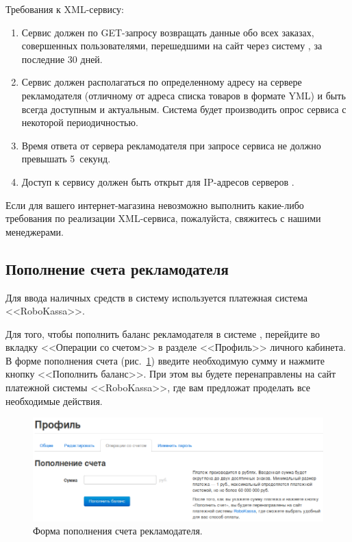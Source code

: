 \documentclass[a4paper,12pt]{article}
\begin{document}
Требования к XML-сервису:
\begin{enumerate}
\item Сервис должен по GET-запросу возвращать данные обо всех заказах, совершенных пользователями, перешедшими на сайт через систему \heymoose{}, за последние 30 дней.
\item Сервис должен располагаться по определенному адресу на сервере рекламодателя (отличному от адреса списка товаров в формате YML) и быть всегда доступным и актуальным. Система \heymoose{} будет производить опрос сервиса с некоторой периодичностью.
\item Время ответа от сервера рекламодателя при запросе сервиса не должно превышать 5~секунд.
\item Доступ к сервису должен быть открыт для IP-адресов серверов \heymoose{}.
\end{enumerate}

Если для вашего интернет-магазина невозможно выполнить какие-либо требования по реализации XML-сервиса, пожалуйста, свяжитесь с нашими менеджерами.

\subsection{Пополнение счета рекламодателя}

Для ввода наличных средств в систему \heymoose{} используется платежная система <<RoboKassa>>.

Для того, чтобы пополнить баланс рекламодателя в системе \heymoose{}, перейдите во вкладку <<Операции со счетом>> в разделе <<Профиль>> личного кабинета. В форме пополнения счета (рис.~\ref{fig:operations}) введите необходимую сумму и нажмите кнопку <<Пополнить баланс>>. При этом вы будете перенаправлены на сайт платежной системы <<RoboKassa>>, где вам предложат проделать все необходимые действия.

\begin{figure}[!ht]
\centering
\includegraphics[width=\textwidth]{include/operations.png}
\caption{Форма пополнения счета рекламодателя.}
\label{fig:operations}
\end{figure}
\end{document}
